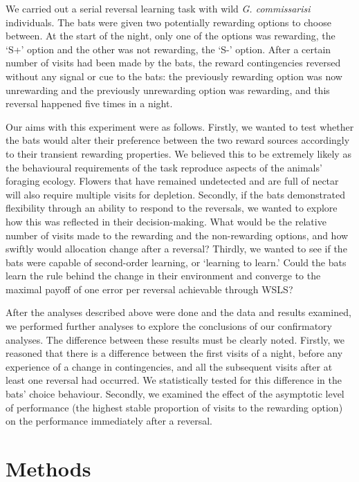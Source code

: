 \documentclass[
]{article}
\begin{document}
We carried out a serial reversal learning task with wild \emph{G. commissarisi} individuals. The bats were given two potentially rewarding options to choose between. At the start of the night, only one of the options was rewarding, the `S+' option and the other was not rewarding, the `S-' option. After a certain number of visits had been made by the bats, the reward contingencies reversed without any signal or cue to the bats: the previously rewarding option was now unrewarding and the previously unrewarding option was rewarding, and this reversal happened five times in a night.

Our aims with this experiment were as follows. Firstly, we wanted to test whether the bats would alter their preference between the two reward sources accordingly to their transient rewarding properties. We believed this to be extremely likely as the behavioural requirements of the task reproduce aspects of the animals' foraging ecology. Flowers that have remained undetected and are full of nectar will also require multiple visits for depletion. Secondly, if the bats demonstrated flexibility through an ability to respond to the reversals, we wanted to explore how this was reflected in their decision-making. What would be the relative number of visits made to the rewarding and the non-rewarding options, and how swiftly would allocation change after a reversal? Thirdly, we wanted to see if the bats were capable of second-order learning, or `learning to learn.' Could the bats learn the rule behind the change in their environment and converge to the maximal payoff of one error per reversal achievable through WSLS?

After the analyses described above were done and the data and results examined, we performed further analyses to explore the conclusions of our confirmatory analyses. The difference between these results must be clearly noted. Firstly, we reasoned that there is a difference between the first visits of a night, before any experience of a change in contingencies, and all the subsequent visits after at least one reversal had occurred. We statistically tested for this difference in the bats' choice behaviour. Secondly, we examined the effect of the asymptotic level of performance (the highest stable proportion of visits to the rewarding option) on the performance immediately after a reversal.

\hypertarget{methods}{%
\section{Methods}\label{methods}}
\end{document}
